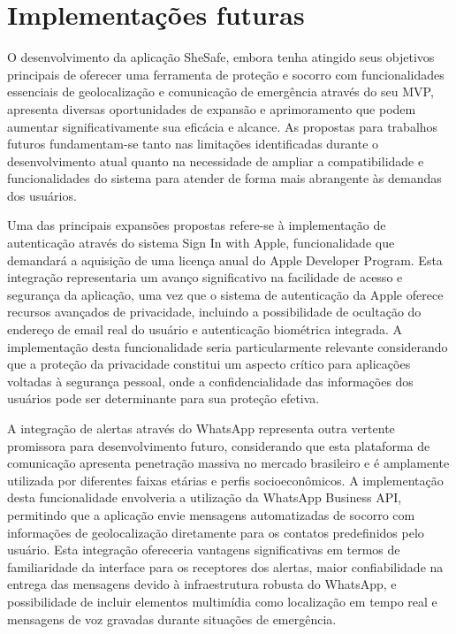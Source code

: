 \chapter{Implementações futuras}

O desenvolvimento da aplicação SheSafe, embora tenha atingido seus objetivos principais de oferecer uma ferramenta de proteção e socorro com funcionalidades essenciais de geolocalização e comunicação de emergência através do seu MVP, apresenta diversas oportunidades de expansão e aprimoramento que podem aumentar significativamente sua eficácia e alcance. As propostas para trabalhos futuros fundamentam-se tanto nas limitações identificadas durante o desenvolvimento atual quanto na necessidade de ampliar a compatibilidade e funcionalidades do sistema para atender de forma mais abrangente às demandas dos usuários.

Uma das principais expansões propostas refere-se à implementação de autenticação através do sistema Sign In with Apple, funcionalidade que demandará a aquisição de uma licença anual do Apple Developer Program. Esta integração representaria um avanço significativo na facilidade de acesso e segurança da aplicação, uma vez que o sistema de autenticação da Apple oferece recursos avançados de privacidade, incluindo a possibilidade de ocultação do endereço de email real do usuário e autenticação biométrica integrada. A implementação desta funcionalidade seria particularmente relevante considerando que a proteção da privacidade constitui um aspecto crítico para aplicações voltadas à segurança pessoal, onde a confidencialidade das informações dos usuários pode ser determinante para sua proteção efetiva.

A integração de alertas através do WhatsApp representa outra vertente promissora para desenvolvimento futuro, considerando que esta plataforma de comunicação apresenta penetração massiva no mercado brasileiro e é amplamente utilizada por diferentes faixas etárias e perfis socioeconômicos. A implementação desta funcionalidade envolveria a utilização da WhatsApp Business API, permitindo que a aplicação envie mensagens automatizadas de socorro com informações de geolocalização diretamente para os contatos predefinidos pelo usuário. Esta integração ofereceria vantagens significativas em termos de familiaridade da interface para os receptores dos alertas, maior confiabilidade na entrega das mensagens devido à infraestrutura robusta do WhatsApp, e possibilidade de incluir elementos multimídia como localização em tempo real e mensagens de voz gravadas durante situações de emergência.

